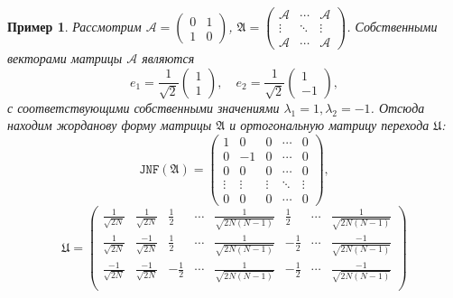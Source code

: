 \documentclass[a4paper]{article}
\newtheorem{example}{Пример}
\begin{document}
 \begin{example}
     Рассмотрим \( \mathcal{A} = \begin{pmatrix} 0 & 1 \\ 1 & 0 \end{pmatrix} \),
         \( \mathfrak{A} =
                    \begin{pmatrix}
                        \mathcal{A} & \cdots & \mathcal{A} \\
                        \vdots      & \ddots & \vdots \\
                        \mathcal{A} & \cdots & \mathcal{A}
                    \end{pmatrix} \).
     Собственными векторами матрицы \( \mathcal{A} \) являются
     \[
         e_1 = \frac{1}{\sqrt2}\begin{pmatrix} 1 \\ 1 \end{pmatrix},\quad e_2 = \frac{1}{\sqrt2}\begin{pmatrix} 1 \\ -1 \end{pmatrix},
             \]
         с соответствующими собственными значениями \( \lambda_1=1, \lambda_2=-1 \).
     Отсюда находим жорданову форму матрицы \( \mathfrak{A} \) и ортогональную матрицу перехода \( \mathfrak{U} \):
     \[
         \mathtt{JNF}(\mathfrak{A}) =
         \begin{pmatrix}
             1 & 0  & 0 & \cdots & 0 \\
             0 & -1 & 0 & \cdots & 0 \\
             0 & 0  & 0 & \cdots & 0 \\
             \vdots & \vdots & \vdots & \ddots & \vdots \\
             0 & 0 & 0 & \cdots & 0
         \end{pmatrix}, \]
     \[
         \mathfrak{U} = 
         \begin{pmatrix}
             \frac{1}{\sqrt{2N}}  & \frac{1}{\sqrt{2N}}  & \frac12  & \cdots & \frac{1}{\sqrt{2N(N-1)}}   & \frac12  & \cdots & \frac{1}{\sqrt{2N(N-1)}} \\
             \frac{1}{\sqrt{2N}}  & \frac{-1}{\sqrt{2N}} & \frac12  & \cdots & \frac{1}{\sqrt{2N(N-1)}}   & -\frac12 & \cdots & \frac{-1}{\sqrt{2N(N-1)}} \\
             \frac{-1}{\sqrt{2N}} & \frac{-1}{\sqrt{2N}} & -\frac12 & \cdots & \frac{1}{\sqrt{2N(N-1)}}   & -\frac12 & \cdots & \frac{-1}{\sqrt{2N(N-1)}} \\

\end{pmatrix}\]
\end{example}
\end{document}
